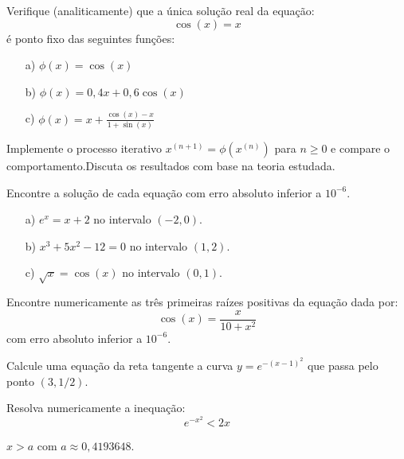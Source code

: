 \begin{Exercise} Verifique (analiticamente) que a única solução real da equação:
  \begin{equation*}
    \cos(x)=x  
  \end{equation*}
é ponto fixo das seguintes funções:
\begin{itemize}
\item[a)] $\phi(x)=\cos(x)$
\item[b)] $\phi(x)=0,4 x+ 0,6\cos(x)$
\item[c)] $\phi(x)=x+\frac{\cos(x)-x}{1+\sin(x)}$
\end{itemize}
Implemente o processo iterativo $x^{(n+1)}=\phi(x^{(n)})$ para $n\geq 0$ e compare o comportamento.Discuta os resultados com base na teoria estudada.
\end{Exercise}


\begin{Exercise} Encontre a solução de cada equação com erro absoluto inferior a $10^{-6}$.
  \begin{itemize}
  \item[a)] $e^x=x+2$ no intervalo $(-2,0)$.
  \item[b)] $x^3+5x^2-12=0$ no intervalo $(1,2)$.
  \item[c)] $\sqrt{x}=\cos(x)$ no intervalo $(0,1)$.
  \end{itemize}
\end{Exercise}

\begin{Exercise} Encontre numericamente as três primeiras raízes positivas da equação dada por:
  \begin{equation*}
    \cos(x)=\frac{x}{10+x^2}  
  \end{equation*}
com erro absoluto inferior a $10^{-6}$.
\end{Exercise}

\begin{Exercise} Calcule uma equação da reta tangente a curva $y=e^{-(x-1)^2}$ que passa pelo ponto $(3, 1/2)$.
\end{Exercise}

\begin{Exercise} Resolva numericamente a inequação:
  \begin{equation*}
    e^{-x^2}<2x  
  \end{equation*}
\end{Exercise}
\begin{Answer}
  \begin{tiny}
    $x>a$ com $a\approx 0,4193648$.    
  \end{tiny}
\end{Answer}

